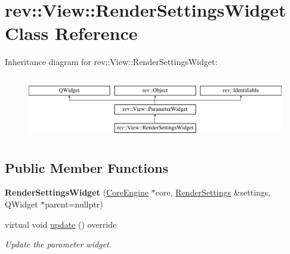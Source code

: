\hypertarget{classrev_1_1_view_1_1_render_settings_widget}{}\section{rev\+::View\+::Render\+Settings\+Widget Class Reference}
\label{classrev_1_1_view_1_1_render_settings_widget}
Inheritance diagram for rev\+::View\+::Render\+Settings\+Widget\+:\begin{figure}[H]
\begin{center}
\leavevmode
\includegraphics[height=2.772277cm]{classrev_1_1_view_1_1_render_settings_widget}
\end{center}
\end{figure}
\subsection*{Public Member Functions}
\begin{DoxyCompactItemize}
\item 
\mbox{\label{classrev_1_1_view_1_1_render_settings_widget_a78ae05b70845e9ebab2aaaa1063e57af}} 
{\bfseries Render\+Settings\+Widget} (\mbox{\hyperlink{classrev_1_1_core_engine}{Core\+Engine}} $\ast$core, \mbox{\hyperlink{classrev_1_1_render_settings}{Render\+Settings}} \&settings, Q\+Widget $\ast$parent=nullptr)
\item 
\mbox{\label{classrev_1_1_view_1_1_render_settings_widget_abb519c0707ee8ee87cd8b4ce47b8c1c1}} 
virtual void \mbox{\hyperlink{classrev_1_1_view_1_1_render_settings_widget_abb519c0707ee8ee87cd8b4ce47b8c1c1}{update}} () override
\begin{DoxyCompactList}\small\item\em Update the parameter widget. \end{DoxyCompactList}\end{DoxyCompactItemize}
